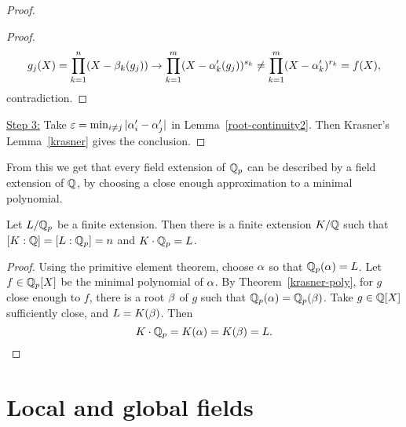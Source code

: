 \begin{proof}
\begin{proof}
\[
g_j(X)=\prod_{k=1}^n (X-\beta_k(g_j))\to \prod_{k=1}^m(X-\alpha_k'(g_j))^{s_k}\ne \prod_{k=1}^m(X-\alpha_k')^{r_k}=f(X),
\]
contradiction.
\end{proof}
\noindent\underline{Step 3:} Take $\varepsilon=\min_{i\ne j} |\alpha_i' - \alpha_j'|$ in Lemma~\ref{root-continuity2}. Then Krasner's Lemma~\ref{krasner} gives the conclusion.
\end{proof}
From this we get that every field extension of $\mathbb{Q}_p$ can be described by a field extension of $\mathbb{Q}$, by choosing a close enough approximation to a minimal polynomial.


\begin{cor}
Let $L/\mathbb{Q}_p$ be a finite extension. Then there is a finite extension $K/\mathbb{Q}$ such that $[K:\mathbb{Q}]=[L:\mathbb{Q}_p]=n$ and $K\cdot \mathbb{Q}_p=L$.
\end{cor}
\begin{proof}
Using the primitive element theorem, choose $\alpha$ so that $\mathbb{Q}_p(\alpha)=L$. Let $f\in \mathbb{Q}_p[X]$ be the minimal polynomial of $\alpha$. By Theorem~\ref{krasner-poly}, for $g$ close enough to $f$, there is a root $\beta$ of $g$ such that $\mathbb{Q}_p(\alpha)=\mathbb{Q}_p(\beta)$. Take $g\in \mathbb{Q}[X]$ sufficiently close, and $L=K(\beta)$. Then 
\[K\cdot \mathbb{Q}_p=K(\alpha)=K(\beta)=L.\qedhere \]
\end{proof}
\chapter{Local and global fields}
